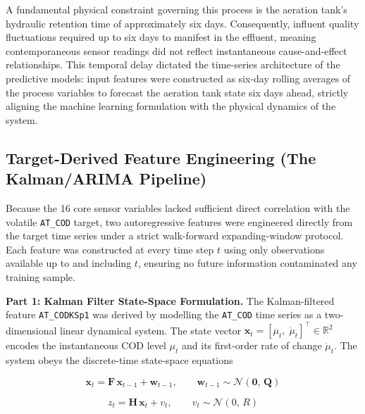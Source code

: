 \documentclass[conference]{IEEEtran}
\begin{document}
A fundamental physical constraint governing this process is the aeration tank's hydraulic retention time of approximately six days. Consequently, influent quality fluctuations required up to six days to manifest in the effluent, meaning contemporaneous sensor readings did not reflect instantaneous cause-and-effect relationships. This temporal delay dictated the time-series architecture of the predictive models: input features were constructed as six-day rolling averages of the process variables to forecast the aeration tank state six days ahead, strictly aligning the machine learning formulation with the physical dynamics of the system.

\subsection{Target-Derived Feature Engineering (The Kalman/ARIMA Pipeline)}

Because the 16 core sensor variables lacked sufficient direct correlation with the volatile \texttt{AT\_COD} target, two autoregressive features were engineered directly from the target time series under a strict walk-forward expanding-window protocol. Each feature was constructed at every time step $t$ using only observations available up to and including $t$, ensuring no future information contaminated any training sample.

\textbf{Part 1: Kalman Filter State-Space Formulation.}
The Kalman-filtered feature \texttt{AT\_CODKSp1} was derived by modelling the \texttt{AT\_COD} time series as a two-dimensional linear dynamical system. The state vector $\mathbf{x}_t = [\mu_t,\;\dot{\mu}_t]^\top \in \mathbb{R}^2$ encodes the instantaneous COD level $\mu_t$ and its first-order rate of change $\dot{\mu}_t$. The system obeys the discrete-time state-space equations

\begin{equation}
    \mathbf{x}_t = \mathbf{F}\,\mathbf{x}_{t-1} + \mathbf{w}_{t-1}, \qquad \mathbf{w}_{t-1} \sim \mathcal{N}(\mathbf{0},\,\mathbf{Q})
    \label{eq:kf_state}
\end{equation}

\begin{equation}
    z_t = \mathbf{H}\,\mathbf{x}_t + v_t, \qquad v_t \sim \mathcal{N}(0,\,R)
    \label{eq:kf_obs}
\end{equation}
\end{document}

